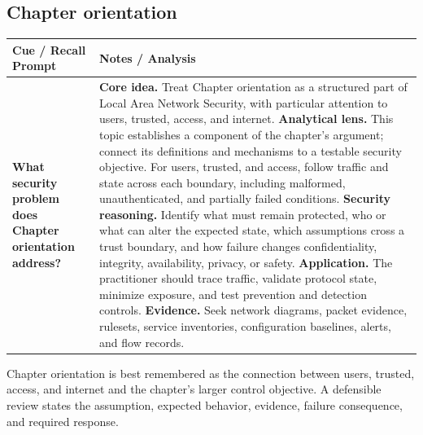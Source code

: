 \documentclass[11pt]{article}
\newcommand{\CornellHeader}{%
\rowcolor{Navy}\color{white}\bfseries Cue / Recall Prompt & \color{white}\bfseries Notes / Analysis\\\hline}
\newcommand{\CornellRow}[2]{%
\cellcolor{CueGray}\RaggedRight\textbf{#1} & \RaggedRight #2\\\hline}
\begin{document}
\subsection*{Chapter orientation}
\begin{longtable}{>{\RaggedRight\arraybackslash}p{}|>{\RaggedRight\arraybackslash}p{}}
\CornellHeader
\CornellRow{What security problem does Chapter orientation address?}{\textbf{Core idea.} Treat Chapter orientation as a structured part of Local Area Network Security, with particular attention to users, trusted, access, and internet. \textbf{Analytical lens.} This topic establishes a component of the chapter's argument; connect its definitions and mechanisms to a testable security objective. For users, trusted, and access, follow traffic and state across each boundary, including malformed, unauthenticated, and partially failed conditions. \textbf{Security reasoning.} Identify what must remain protected, who or what can alter the expected state, which assumptions cross a trust boundary, and how failure changes confidentiality, integrity, availability, privacy, or safety. \textbf{Application.} The practitioner should trace traffic, validate protocol state, minimize exposure, and test prevention and detection controls. \textbf{Evidence.} Seek network diagrams, packet evidence, rulesets, service inventories, configuration baselines, alerts, and flow records.}
\end{longtable}
\begin{topicsummary}
Chapter orientation is best remembered as the connection between users, trusted, access, and internet and the chapter's larger control objective. A defensible review states the assumption, expected behavior, evidence, failure consequence, and required response.
\end{topicsummary}
\end{document}
